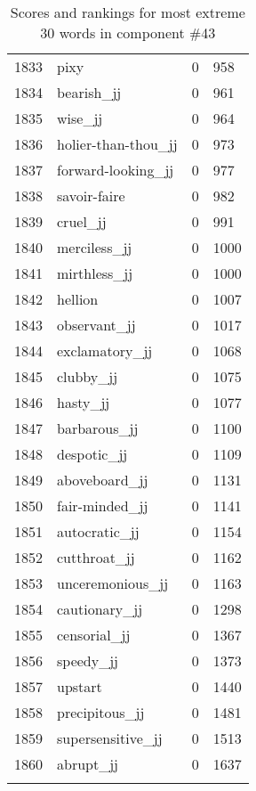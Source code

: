 \begin{longtable}[!htbp]{| rlr@{.}l |}
    1833 & pixy & 0 & 958 \\
    1834 & bearish\_jj & 0 & 961 \\
    1835 & wise\_jj & 0 & 964 \\
    1836 & holier-than-thou\_jj & 0 & 973 \\
    1837 & forward-looking\_jj & 0 & 977 \\
    1838 & savoir-faire & 0 & 982 \\
    1839 & cruel\_jj & 0 & 991 \\
    1840 & merciless\_jj & 0 & 1000 \\
    1841 & mirthless\_jj & 0 & 1000 \\
    1842 & hellion & 0 & 1007 \\
    1843 & observant\_jj & 0 & 1017 \\
    1844 & exclamatory\_jj & 0 & 1068 \\
    1845 & clubby\_jj & 0 & 1075 \\
    1846 & hasty\_jj & 0 & 1077 \\
    1847 & barbarous\_jj & 0 & 1100 \\
    1848 & despotic\_jj & 0 & 1109 \\
    1849 & aboveboard\_jj & 0 & 1131 \\
    1850 & fair-minded\_jj & 0 & 1141 \\
    1851 & autocratic\_jj & 0 & 1154 \\
    1852 & cutthroat\_jj & 0 & 1162 \\
    1853 & unceremonious\_jj & 0 & 1163 \\
    1854 & cautionary\_jj & 0 & 1298 \\
    1855 & censorial\_jj & 0 & 1367 \\
    1856 & speedy\_jj & 0 & 1373 \\
    1857 & upstart & 0 & 1440 \\
    1858 & precipitous\_jj & 0 & 1481 \\
    1859 & supersensitive\_jj & 0 & 1513 \\
    1860 & abrupt\_jj & 0 & 1637 \\
    \hline
    \caption{Scores and rankings for most extreme 30 words in component \#43} \\
\end{longtable}
